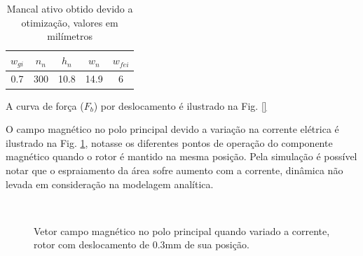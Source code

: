 \begin{table}[ht!]
	\centering
	\begin{tabular}{c c c c c}
		 $w_{gi}$ 	& $n_n$ & $h_n$ & $w_n$ & $w_{fei}$  \\ \hline \hline
		 0.7		& 300  	& 10.8 	& 14.9	& 6
	\end{tabular} 
	\caption{Mancal ativo obtido devido a otimização, valores em milímetros}
	\label{tab:ativo:resultado} 
\end{table}

A curva de força ($F_b$) por deslocamento é ilustrado na Fig. \ref{}


O campo magnético no polo principal devido a variação na corrente elétrica é ilustrado na Fig. \ref{fig:ativo:fem:b:polos}, notasse os diferentes pontos de operação do componente magnético quando o rotor é mantido na mesma posição. Pela simulação é possível notar que o espraiamento da área sofre aumento com a corrente, dinâmica não levada em consideração na modelagem analítica. 

\begin{figure}[!ht]
	\centering
		\\
	\caption{Vetor campo magnético no polo principal quando variado a corrente, rotor com deslocamento de 0.3mm de sua posição.}
	\label{fig:ativo:fem:b:polos}
\end{figure}


